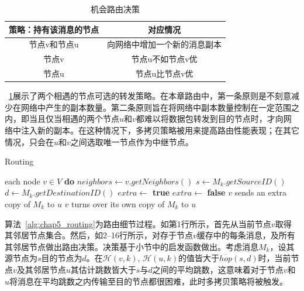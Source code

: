 \begin{table}[bt]
  \caption{机会路由决策}
  \label{tab:chap5_routing}
  \centering
  \begin{tabular}{cc}
  \hline
   \textbf{策略：持有该消息的节点} & \textbf{对应情况}  \\
    \hline
    节点v和节点u & 向网络中增加一个新的消息副本\\
    节点v & 节点u不如节点v优\\
    节点u & 节点u比节点v优\\
    \hline
  \end{tabular}
\end{table}

\tablename~\ref{tab:chap5_routing}展示了两个相遇的节点可选的转发策略。在本章路由中，第一条原则是不刻意减少在网络中产生的副本数量。第二条原则旨在将网络中副本数量控制在一定范围之内，即当且仅当相遇的两个节点$u$和$v$都难以将数据包转发到目的节点时，才向网络中注入新的副本。在这种情况下，多拷贝策略被用来提高路由性能表现；在其它情况，只会在$u$和$v$之间选取唯一节点作为中继节点。

\begin{algorithm}[tbp] %
\renewcommand{\algorithmicrequire}{\textbf{For}}
\caption{Routing} %
\label{alg:chap5_routing} %
\begin{algorithmic}[1] %
\REQUIRE each node $v\in V$ \textbf{do}
\STATE $neighbors\leftarrow v.getNeighbors()$
        \STATE $s\leftarrow M_k.getSourceID()$
        \STATE $d\leftarrow M_k.getDestinationID()$
            \STATE $extra\leftarrow$ \textbf{true}
        \ELSE
            \STATE $extra\leftarrow$ \textbf{false}
        \ENDIF
            \STATE $v$ sends an extra copy of $M_k$ to $u$          
            \STATE $v$ turns over its own copy of $M_k$ to $u$
        \ENDIF
    \ENDFOR
\ENDFOR
\end{algorithmic}
\end{algorithm}

算法~\ref{alg:chap5_routing}为路由细节过程。如第1行所示，首先从当前节点$v$取得其邻居节点集合。然后，如2--16行所示，对存于节点$v$缓存中的每条消息，及所有其邻居节点做出路由决策。决策基于\label{chap5:启发函数}小节中的启发函数做出。考虑消息$M_k$，设其源节点为$s$目的节点为$d$。在$\mathcal{H}(v,k)$, $\mathcal{H}(u,k)$的值皆大于$\overline{hop}(s,d)$时，当前节点$v$及其邻居节点$u$其估计跳数皆大于$s$与$d$之间的平均跳数，这意味着对于节点$v$和$u$将消息在平均跳数之内传输至目的节点都很困难，此时多拷贝策略将被触发。

